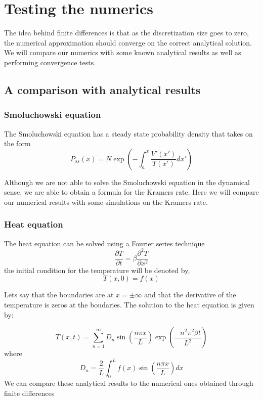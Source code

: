 \chapter{Testing the numerics}

The idea behind finite differences is that as the discretization size goes to zero, the numerical approximation should converge on the correct analytical solution. We will compare our numerics with some known analytical results as well as performing convergence tests.
\section{A comparison with analytical results}
\subsection{Smoluchowski equation}
The Smoluchowski equation has a steady state probability density that takes on the form
\begin{equation}
P_{ss}(x) = N \exp{\left(-\int_a^x \frac{V'(x')}{T(x')} dx' \right)}
\end{equation}

Although we are not able to solve the Smoluchowski equation in the dynamical sense, we are able to obtain a formula for the Kramers rate. Here we will compare our numerical results with some simulations on the Kramers rate.

\subsection{Heat equation}
The heat equation can be solved using a Fourier series technique
\begin{equation}
\frac{\partial T}{\partial t} = \beta \frac{\partial^2 T}{\partial x^2}
\end{equation}
the initial condition for the temperature will be denoted by,
\begin{equation}
T(x, 0) = f(x)
\end{equation}

Lets say that the boundaries are at $x = \pm \infty$ and that the derivative of the temperature is zeros at the boudaries. The solution to the heat equation is given by:

\begin{equation}
T(x, t) = \sum_{n=1}^\infty D_n \sin \left(\frac{n \pi x}{L} \right) \exp\left(\frac{-n^2 \pi^2 \beta t}{L^2}\right)
\end{equation}
where
\begin{equation}
D_n = \frac{2}{L} \int_0^L f(x) \sin \left(\frac{n \pi x}{L} \right) dx
\end{equation}
We can compare these analytical results to the numerical ones obtained through finite differences

